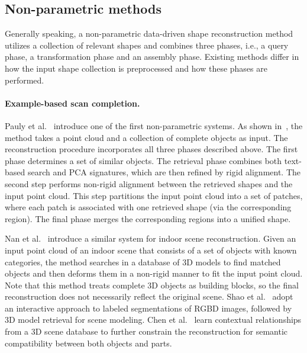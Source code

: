 \vspace{-.2cm}

\subsection{Non-parametric methods}


Generally speaking, a non-parametric data-driven shape reconstruction method utilizes a collection of relevant shapes and combines three phases, i.e., a query phase, a transformation phase and an assembly phase. Existing methods differ in how the input shape collection is preprocessed and how these phases are performed.


\paragraph*{Example-based scan completion.} Pauly et al.~\cite{Pauly:2005:ESC} introduce one of the first non-parametric systems. As shown in~\cite{Pauly:2005:ESC}, the method takes a point cloud and a collection of complete objects as input. The reconstruction procedure incorporates all three phases described above. The first phase determines a set of similar objects. The retrieval phase combines both text-based search and PCA signatures, which are then refined by rigid alignment. The second step performs non-rigid alignment between the retrieved shapes and the input point cloud. This step partitions the input point cloud into a set of patches, where each patch is associated with one retrieved shape (via the corresponding region). The final phase merges the corresponding regions into a unified shape.

Nan et al.~\cite{Nan:2012:SAC} introduce a similar system for indoor scene reconstruction. Given an input point cloud of an indoor scene that consists of a set of objects with known categories, the method searches in a database of 3D models to find matched objects and then deforms them in a non-rigid manner to fit the input point cloud. Note that this method treats complete 3D objects as building blocks, so the final reconstruction does not necessarily reflect the original scene.
Shao et al.~\cite{Shao:2012:IAS} adopt an interactive approach to labeled segmentations of RGBD images, followed by 3D model retrieval for scene modeling. Chen et al.~\cite{Chen:2014:ASM} learn contextual relationships from a 3D scene database to further constrain the reconstruction for semantic compatibility between both objects and parts.

